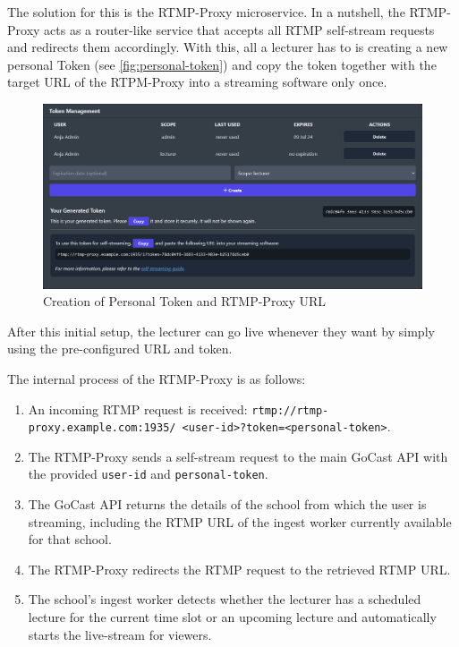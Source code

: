 The solution for this is the RTMP-Proxy microservice. In a nutshell, the RTMP-Proxy acts as a router-like service that accepts all \ac{RTMP} self-stream requests and redirects them accordingly. With this, all a lecturer has to is creating a new personal Token (see \autoref{fig:personal-token}) and copy the token together with the target URL of the RTPM-Proxy into a streaming software only once.

\begin{figure}[htpb]
    \centering
    \includegraphics[width=\textwidth]{images/PersonalToken.png}
    \caption[Creation of Personal Token and RTMP-Proxy URL]{Creation of Personal Token and RTMP-Proxy URL}\label{fig:personal-token}
\end{figure}

After this initial setup, the lecturer can go live whenever they want by simply using the pre-configured URL and token.

The internal process of the RTMP-Proxy is as follows: 

\begin{enumerate}
    \item An incoming \ac{RTMP} request is received: 
    \texttt{rtmp://rtmp-proxy.example.com:1935/ <user-id>?token=<personal-token>}.
    \item The RTMP-Proxy sends a self-stream request to the main GoCast \ac{API} with the provided \texttt{user-id} and \texttt{personal-token}.
    \item The GoCast \ac{API} returns the details of the school from which the user is streaming, including the \ac{RTMP} URL of the ingest worker currently available for that school.
    \item The RTMP-Proxy redirects the \ac{RTMP} request to the retrieved \ac{RTMP} URL.
    \item The school's ingest worker detects whether the lecturer has a scheduled lecture for the current time slot or an upcoming lecture and automatically starts the live-stream for viewers.
\end{enumerate}

